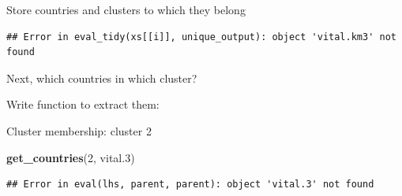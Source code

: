 \documentclass[ignorenonframetext,]{beamer}
\newenvironment{Shaded}{\begin{snugshade}}{\end{snugshade}}
\newcommand{\ControlFlowTok}[1]{\textcolor[rgb]{0.13,0.29,0.53}{\textbf{#1}}}
\newcommand{\DataTypeTok}[1]{\textcolor[rgb]{0.13,0.29,0.53}{#1}}
\newcommand{\DecValTok}[1]{\textcolor[rgb]{0.00,0.00,0.81}{#1}}
\newcommand{\FloatTok}[1]{\textcolor[rgb]{0.00,0.00,0.81}{#1}}
\newcommand{\KeywordTok}[1]{\textcolor[rgb]{0.13,0.29,0.53}{\textbf{#1}}}
\newcommand{\NormalTok}[1]{#1}
\newcommand{\OperatorTok}[1]{\textcolor[rgb]{0.81,0.36,0.00}{\textbf{#1}}}
\newcommand{\StringTok}[1]{\textcolor[rgb]{0.31,0.60,0.02}{#1}}
\begin{document}
\begin{frame}[fragile]{Store countries and clusters to which they
belong}
\protect\hypertarget{store-countries-and-clusters-to-which-they-belong}{}

\begin{Shaded}
\end{Shaded}

\begin{verbatim}
## Error in eval_tidy(xs[[i]], unique_output): object 'vital.km3' not found
\end{verbatim}

Next, which countries in which cluster?

Write function to extract them:

\begin{Shaded}
\end{Shaded}

\end{frame}

\begin{frame}[fragile]{Cluster membership: cluster 2}
\protect\hypertarget{cluster-membership-cluster-2}{}

\begin{Shaded}
\begin{Highlighting}[]
\KeywordTok{get_countries}\NormalTok{(}\DecValTok{2}\NormalTok{, vital}\FloatTok{.3}\NormalTok{)}
\end{Highlighting}
\end{Shaded}

\begin{verbatim}
## Error in eval(lhs, parent, parent): object 'vital.3' not found
\end{verbatim}

\end{frame}
\end{document}

